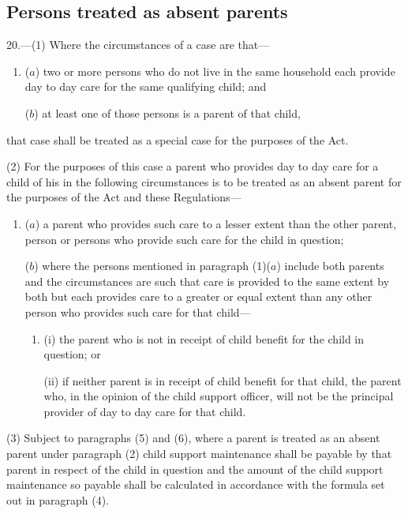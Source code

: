 \documentclass[a4paper]{article}
\begin{document}
\subsection[20. Persons treated as absent parents]{Persons treated as absent parents}

20.—(1) Where the circumstances of a case are that—
\begin{enumerate}\item[]
($a$) two or more persons who do not live in the same household each provide day to day care for the same qualifying child; and

($b$) at least one of those persons is a parent of that child,
\end{enumerate}
that case shall be treated as a special case for the purposes of the Act.

(2) For the purposes of this case a parent who provides day to day care for a child of his in the following circumstances is to be treated as an absent parent for the purposes of the Act and these Regulations—
\begin{enumerate}\item[]
($a$) a parent who provides such care to a lesser extent than the other parent, person or persons who provide such care for the child in question;

($b$) where the persons mentioned in paragraph (1)($a$) include both parents and the circumstances are such that care is provided to the same extent by both but each provides care to a greater or equal extent than any other person who provides such care for that child—
\begin{enumerate}\item[]
(i) the parent who is not in receipt of child benefit for the child in question; or

(ii) if neither parent is in receipt of child benefit for that child, the parent who, in the opinion of the child support officer, will not be the principal provider of day to day care for that child.
\end{enumerate}
\end{enumerate}

(3) Subject to paragraphs (5) and (6), where a parent is treated as an absent parent under paragraph (2) child support maintenance shall be payable by that parent in respect of the child in question and the amount of the child support maintenance so payable shall be calculated in accordance with the formula set out in paragraph (4).
\end{document}

